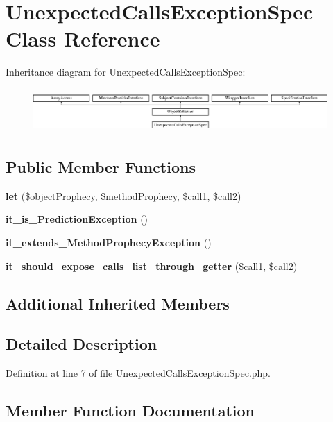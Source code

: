 \section{Unexpected\+Calls\+Exception\+Spec Class Reference}
\label{classspec_1_1_prophecy_1_1_exception_1_1_prediction_1_1_unexpected_calls_exception_spec}
Inheritance diagram for Unexpected\+Calls\+Exception\+Spec\+:\begin{figure}[H]
\begin{center}
\leavevmode
\includegraphics[height=1.696970cm]{classspec_1_1_prophecy_1_1_exception_1_1_prediction_1_1_unexpected_calls_exception_spec}
\end{center}
\end{figure}
\subsection*{Public Member Functions}
\begin{DoxyCompactItemize}
\item 
{\bf let} (\$object\+Prophecy, \$method\+Prophecy, \$call1, \$call2)
\item 
{\bf it\+\_\+is\+\_\+\+Prediction\+Exception} ()
\item 
{\bf it\+\_\+extends\+\_\+\+Method\+Prophecy\+Exception} ()
\item 
{\bf it\+\_\+should\+\_\+expose\+\_\+calls\+\_\+list\+\_\+through\+\_\+getter} (\$call1, \$call2)
\end{DoxyCompactItemize}
\subsection*{Additional Inherited Members}


\subsection{Detailed Description}


Definition at line 7 of file Unexpected\+Calls\+Exception\+Spec.\+php.



\subsection{Member Function Documentation}
